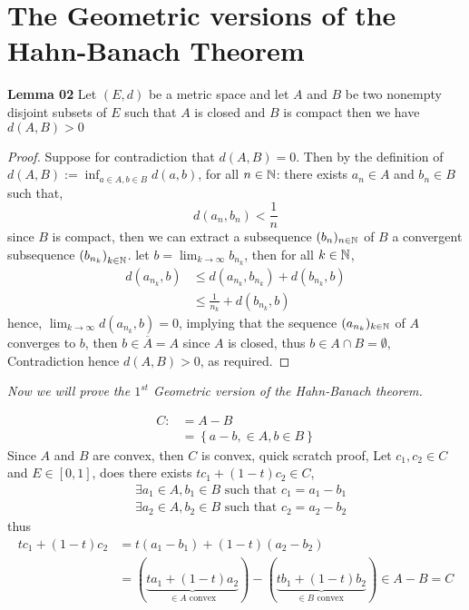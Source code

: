 \documentclass{report}
\begin{document}
      

\section{The Geometric versions of the Hahn-Banach Theorem}      

\textbf{Lemma 02}
Let $(E,d)  $ be a metric
space and let $A $ and $B $ be two nonempty 
disjoint subsets of $E $ such that 
$A $ is closed and $B $ is compact
then we have $d(A,B) > 0$
\begin{proof}
Suppose for contradiction that $d(A,B) =0 $. Then by
the definition of $d(A,B):= \inf_{a \in  A, b \in B} d(a,b)$,
for all $n \in \mathbb{N}$: there exists 
$a_{n} \in  A $ and $b_{n} \in  B $ such that, 
\[
d(a_{n}, b_{n})  <  \frac{1}{n}
\] 
since $B $ is compact, then we can extract a subsequence 
$(b_{n}) _{n \in  \mathbb{N}} $ of $B $ a convergent
subsequence $\left( b_{n_{k}} \right)_{k \in \mathbb{N}}$. 
let $b = \lim_{k \to \infty } b_{n_{k}} $, 
then for all $k \in \mathbb{N} $, 
\begin{align*}
	d(a_{n_{k}}, b)  & \leq 
	d(a_{n_{k}}, b_{n_{k}})  + 
	d(b_{n_{k}}, b)  
	\\
			 & \leq 
	\frac{1}{n_{k}} + d(b_{n_{k}}, b) 
\end{align*}
hence, $\lim_{k \to \infty} d(a_{n_{k}}, b) = 0$, 
implying that the sequence $(a_{n_{k}})_{k \in  \mathbb{N}}  $ of $A $ 
converges to $b $, then $b \in  \overline{A}= A $
since $A $ is closed, 
thus $b \in A \cap B = \emptyset  $, Contradiction hence
$d(A,B) > 0 $, as required.
\end{proof}
\begin{center}
\it Now we will prove the $1^{st} $ Geometric version of 
the Hahn-Banach theorem. \normalfont
\end{center}
\begin{align*}
 	C :&= A-B \\
	   &= 
	   \left\{ 
		   a-b, \in A, 
		   b \in  B
	   \right\}
\end{align*}
Since $A $ and $B $ are convex, then $C$ is 
convex, quick scratch proof, 
\divider
Let $c_1, c_2 \in  C $ and $E \in [0,1] $, does there
exists $ t c_1 + (1-t) c_2 \in C$,  
\begin{align*}
&\exists a_1 \in  A, b_1 \in  B \text{ such that } 
c_1 = a_1-b_1 \\
& \exists a_2 \in  A, b_2 \in  B \text{ such that }  
c_2 = a_2 - b_2
\end{align*}
thus 
\begin{align*}
	tc_1 + (1-t) c_2 &=
	t(a_1-b_1)  +
	 (1-t) (a_2-b_2)  \\
			 &= 
	\left( 
	\underbrace{
	ta_1 + (1-t) a_2
	}_{\in  A \text{ convex} } 
	\right) - 
	\left( 
		\underbrace{
		tb_1 + 
		(1-t) b_2
		}_{\in B 
		\text{ convex } } 
	\right) \in A - B = C
\end{align*} 
\end{document}
